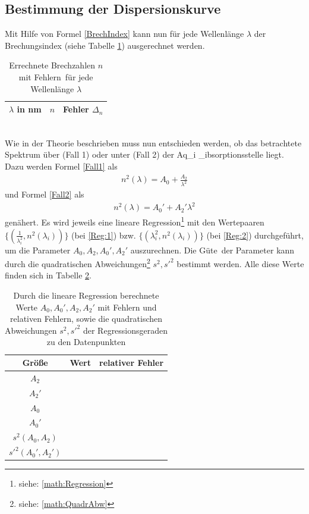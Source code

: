 \subsection{Bestimmung der Dispersionskurve}
Mit Hilfe von Formel \eqref{BrechIndex} kann nun für jede Wellenlänge $\lambda$ der Brechungsindex (siehe Tabelle \ref{tab:Brechzahl}) ausgerechnet werden.
\begin{table}[h!]
	\centering	
	\begin{tabular}{c|c|c}
		$\lambda$ in \si{\nano\meter} & $n$ & Fehler $\Delta_n$ \\
		\hline
		
	\end{tabular}
	\caption[Errechnete Brechzahlen $n$ mit Fehlern für jede Wellenlänge $\lambda$]{Errechnete Brechzahlen $n$ mit Fehlern\footnotemark\ für jede Wellenlänge $\lambda$}
	\label{tab:Brechzahl}
\end{table}
 \\
Wie in der Theorie beschrieben muss nun entschieden werden, ob das betrachtete Spektrum über (Fall 1) oder unter (Fall 2) der Aq_i _ibsorptionsstelle liegt. Dazu werden Formel \eqref{Fall1} als
\begin{align}\label{Reg:1}
	n^2(\lambda) = A_0 + \frac{A_2}{\lambda^2}
\end{align}
und Formel \eqref{Fall2} als
\begin{align}\label{Reg:2}
	n^2(\lambda) = A_0' + A_2'\lambda^2
\end{align}
genähert. Es wird jeweils eine lineare Regression\footnote{siehe: \ref{math:Regression}} mit den Wertepaaren $\{ (\frac{1}{\lambda_i^2}, n^2(\lambda_i)) \}$ (bei \eqref{Reg:1}) bzw. $\{ (\lambda_i^2, n^2(\lambda_i)) \}$ (bei \eqref{Reg:2}) durchgeführt, um die Parameter $A_0, A_2, A_0', A_2'$ auszurechnen. Die \glqq Güte\grqq\ der Parameter kann durch die quadratischen Abweichungen\footnote{siehe: \ref{math:QuadrAbw}} $s^2, s'^2$ bestimmt werden. Alle diese Werte finden sich in Tabelle \ref{tab:Regression}.
\begin{table}[h!]
	\centering
	\begin{tabular}{c|c|c}
		Größe & Wert & relativer Fehler \\
		\hline
		$A_2$ &  &  \\
		$A_2'$ &  &  \\
		$A_0$ &  &  \\
		$A_0'$ &  &  \\
		\hline
		$s^2(A_0,A_2)$ &  & \\
		$s'^2(A_0',A_2')$ &  &
	\end{tabular}
	\caption{Durch die lineare Regression berechnete Werte $A_0,A_0',A_2,A_2'$ mit Fehlern und relativen Fehlern, sowie die quadratischen Abweichungen $s^2,s'^2$ der Regressionsgeraden zu den Datenpunkten}
	\label{tab:Regression}
\end{table}
